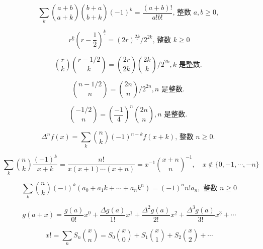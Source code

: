 \begin{equation}
    \sum_{k}{a+b \choose a+k}{b+a \choose b+k}(-1)^{k}=\frac{(a+b) !}{a ! b !} \text {, 整数 } a, b \geqslant 0 \text {, }
\end{equation}

\setcounter{equation}{33}
\begin{equation}
    r^{\underline{k}}(r-\frac{1}{2})^{\underline{k}}=(2 r)^{\underline{2k}} / 2^{2 k} \text {, 整数 } k \geqslant 0
\end{equation}

\begin{equation}
    {r \choose k}{r-1 / 2 \choose k}={2 r \choose 2 k}{2 k \choose k} / 2^{2 k}, k \text { 是整数. }
\end{equation}

\begin{equation}
    {n-1 / 2 \choose n}={2 n \choose n} / 2^{2 n}, n \text { 是整数. }
\end{equation}

\begin{equation}
    {-1 / 2 \choose n}=\left(\frac{-1}{4}\right)^{n}{2 n \choose n}, n \text { 是整数. }
\end{equation}

\setcounter{equation}{39}

\begin{equation}
    \Delta^{n} f(x)=\sum_{k}{n \choose k}(-1)^{n-k} f(x+k) \text {, 整数 } n \geqslant 0 \text {. }
\end{equation}

\begin{equation}
    \sum_{k}{n \choose k} \frac{(-1)^{k}}{x+k}=\frac{n !}{x(x+1) \cdots(x+n)}=x^{-1}{x+n \choose n}^{-1}, \quad x \notin\{0,-1, \cdots,-n\}
\end{equation}

\begin{equation}
    \sum_{k}{n \choose k}(-1)^{k}\left(a_{0}+a_{1} k+\cdots+a_{n} k^{n}\right)=(-1)^{n} n ! a_{n}, \text { 整数 } n \geqslant 0
\end{equation}

\setcounter{equation}{44}
\begin{equation}
    g(a+x)=\frac{g(a)}{0 !} x^{\underline{0}}+\frac{\Delta g(a)}{1 !} x^{\underline{1}}+\frac{\Delta^{2} g(a)}{2 !} x^{\underline{2}}+\frac{\Delta^{3} g(a)}{3 !} x^{\underline{3}}+\cdots
\end{equation}

\begin{equation}
    x !=\sum_{n} S_{n}{x \choose n}=S_{0}{x \choose 0}+S_{1}{x \choose 1}+S_{2}{x \choose 2}+\cdots
\end{equation}


